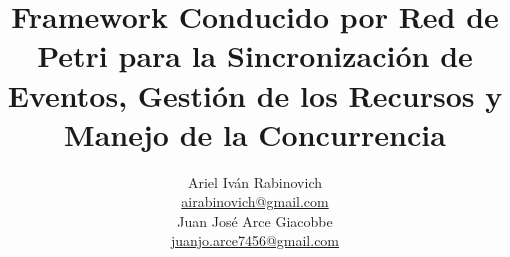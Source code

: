\documentclass{report}
\date{}
\begin{document}
    \newcommand{\nombreTesis}{Framework Conducido por Red de Petri para la Sincronización de Eventos, 
    Gestión de los Recursos y Manejo de la Concurrencia}
    \newcommand{\nombreFramework}{Baboon}
    \newcommand{\javapetriconcurrencymonitor}{Java Petri Concurrency Monitor }
    
    \newcommand{\repoMonitor}{https://github.com/airabinovich/java_petri_engine.git}
    \newcommand{\repoFramework}{https://github.com/juanjoarce7456/petri_event_dispatcher.git}

    \newcommand{\ResetCounter}{\setcounter{subfigure}{0}}
    
    \title{\nombreTesis}

    \author{Ariel Iván Rabinovich \\ \href{mailto:airabinovich@gmail.com}{airabinovich@gmail.com} \\ Juan José Arce Giacobbe \\ \href{mailto:juanjo.arce7546@gmail.com}{juanjo.arce7456@gmail.com}}
    \graphicspath{ {resources/images/} }
    
\end{document}
